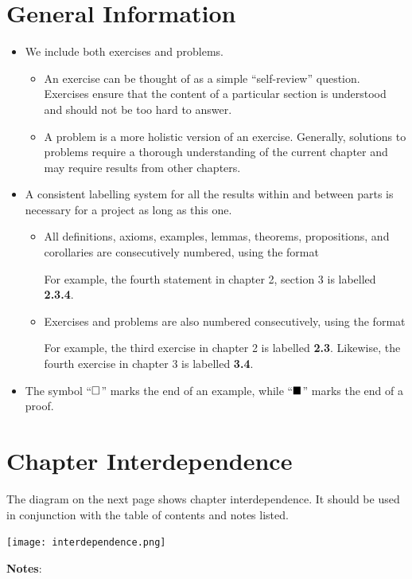 \section*{General Information}
\begin{itemize}
    \item We include both exercises and problems.
    \begin{itemize}
        \item An exercise can be thought of as a simple ``self-review'' question. Exercises ensure that the content of a particular section is understood and should not be too hard to answer.
        \item A problem is a more holistic version of an exercise. Generally, solutions to problems require a thorough understanding of the current chapter and may require results from other chapters.
    \end{itemize}
    \item A consistent labelling system for all the results within and between parts is necessary for a project as long as this one.
    \begin{itemize}
        \item All definitions, axioms, examples, lemmas, theorems, propositions, and corollaries are consecutively numbered, using the format
        \begin{quote}
        \end{quote}
        For example, the fourth statement in chapter 2, section 3 is labelled \textbf{2.3.4}.
        \item Exercises and problems are also numbered consecutively, using the format
        \begin{quote}
        \end{quote}
        For example, the third exercise in chapter 2 is labelled \textbf{2.3}. Likewise, the fourth exercise in chapter 3 is labelled \textbf{3.4}.
    \end{itemize}
    \item The symbol ``$\square$'' marks the end of an example, while ``$\blacksquare$'' marks the end of a proof.
\end{itemize}

\section*{Chapter Interdependence}
The diagram on the next page shows chapter interdependence. It should be used in conjunction with the table of contents and notes listed.

\newpage
\texttt{[image: interdependence.png]}

\newpage

\textbf{Notes}:
\interdependencenotes
